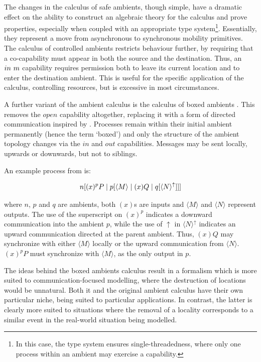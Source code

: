 The changes in the calculus of safe ambients, though simple, have a
dramatic effect on the ability to construct an algebraic theory for
the calculus and prove properties, especially when coupled with an
appropriate type system\footnote{In this case, the type system ensures
  single-threadedness, where only one process within an ambient may
  exercise a capability.}.  Essentially, they represent a move from
asynchronous to synchronous mobility primitives.  The calculus of
controlled ambients \cite{controlledamb02} restricts behaviour
further, by requiring that a co-capability must appear in both the
source and the destination.  Thus, an $in\ m$ capability requires
permission both to leave its current location and to enter the
destination ambient. This is useful for the specific application of
the calculus, controlling resources, but is excessive in most
circumstances.

A further variant of the ambient calculus is the calculus of boxed
ambients \cite{boxedamb01}.  This removes the $open$ capability
altogether, replacing it with a form of directed communication inspired
by \cite{seal}.  Processes remain within their initial ambient
permanently (hence the term `boxed') and only the structure of the
ambient topology changes via the $in$ and $out$ capabilities.  Messages
may be sent locally, upwards or downwards, but not to siblings.

An example process from \cite{boxedamb01} is:

\begin{equation}
n[(x)^pP \;|\; p[\langle M \rangle \;|\; (x)Q \;|\; q[\langle N
\rangle^\uparrow ]]]
\end{equation}

\noindent where $n$, $p$ and $q$ are ambients, both $(x)$s are inputs
and $\langle M \rangle$ and $\langle N \rangle$ represent outputs.
The use of the superscript on $(x)^p$ indicates a downward
communication into the ambient $p$, while the use of $\uparrow$ in
$\langle N \rangle^\uparrow$ indicates an upward communication
directed at the parent ambient.  Thus, $(x)Q$ may synchronize with
either $\langle M \rangle$ locally or the upward communication from
$\langle N \rangle$.  $(x)^pP$ must synchronize with $\langle M
\rangle$, as the only output in $p$.

The ideas behind the boxed ambients calculus result in a formalism which
is more suited to communication-focused modelling, where the destruction
of locations would be unnatural.  Both it and the original ambient
calculus have their own particular niche, being suited to particular
applications.  In contrast, the latter is clearly more suited to
situations where the removal of a locality corresponds to a similar
event in the real-world situation being modelled.

